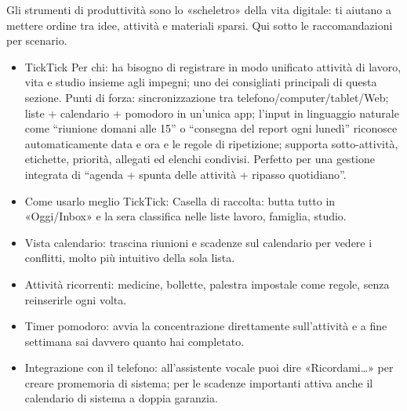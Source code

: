 


Gli strumenti di produttività sono lo «scheletro» della vita digitale: ti aiutano a mettere ordine tra idee, attività e materiali sparsi. Qui sotto le raccomandazioni per scenario.


\begin{itemize}
  \item TickTick Per chi: ha bisogno di registrare in modo unificato attività di lavoro, vita e studio insieme agli impegni; uno dei consigliati principali di questa sezione. Punti di forza: sincronizzazione tra telefono/computer/tablet/Web; liste + calendario + pomodoro in un'unica app; l'input in linguaggio naturale come “riunione domani alle 15” o “consegna del report ogni lunedì” riconosce automaticamente data e ora e le regole di ripetizione; supporta sotto-attività, etichette, priorità, allegati ed elenchi condivisi. Perfetto per una gestione integrata di “agenda + spunta delle attività + ripasso quotidiano”.
  \item Come usarlo meglio TickTick: Casella di raccolta: butta tutto in «Oggi/Inbox» e la sera classifica nelle liste lavoro, famiglia, studio.
  \item Vista calendario: trascina riunioni e scadenze sul calendario per vedere i conflitti, molto più intuitivo della sola lista.
  \item Attività ricorrenti: medicine, bollette, palestra impostale come regole, senza reinserirle ogni volta.
  \item Timer pomodoro: avvia la concentrazione direttamente sull'attività e a fine settimana sai davvero quanto hai completato.
  \item Integrazione con il telefono: all'assistente vocale puoi dire «Ricordami…» per creare promemoria di sistema; per le scadenze importanti attiva anche il calendario di sistema a doppia garanzia.
\end{itemize}

